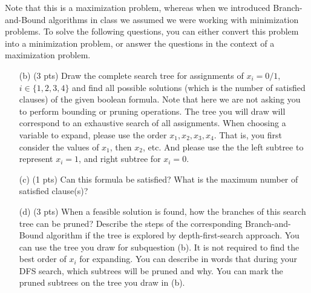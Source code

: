 \documentclass{article}
\begin{document}
Note that this is a maximization problem, whereas when we introduced Branch-and-Bound algorithms in class we assumed we were working with minimization problems. To solve the following questions, you can either convert this problem into a minimization problem, or answer the questions in the context of a maximization problem. 
\begin{itemize}
\item[(b)] (3 pts) Draw the complete search tree for assignments of $x_i=0/1$, $i \in \{ 1,2,3,4 \}$ and find all possible solutions (which is the number of satisfied clauses) of the given boolean formula. Note that here we are not asking you to perform bounding or pruning operations. The tree you will draw will correspond to an exhaustive search of all assignments. When choosing a variable to expand, please use the order $x_1, x_2, x_3, x_4$. That is, you first consider the values of $x_1$, then $x_2$, etc. And please use the the left subtree to represent $x_i=1$, and right subtree for $x_i=0$.

\item[(c)] (1 pts) Can this formula be satisfied? What is the maximum number of satisfied clause(s)?

\item[(d)] (3 pts) When a feasible solution is found, how the branches of this search tree can be pruned? Describe the steps of the corresponding Branch-and-Bound algorithm if the tree is explored by depth-first-search approach. You can use the tree you draw for subquestion (b). It is not required to find the best order of $x_i$ for expanding. You can describe in words that during your DFS search, which subtrees will be pruned and why. You can mark the pruned subtrees on the tree you draw in (b).

%
%
%
%			

\end{itemize}
\end{document}
